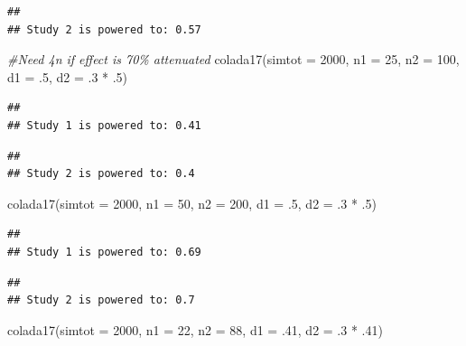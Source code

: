 \documentclass[
]{book}
\newenvironment{Shaded}{\begin{snugshade}}{\end{snugshade}}
\newcommand{\AttributeTok}[1]{\textcolor[rgb]{0.77,0.63,0.00}{#1}}
\newcommand{\CommentTok}[1]{\textcolor[rgb]{0.56,0.35,0.01}{\textit{#1}}}
\newcommand{\DecValTok}[1]{\textcolor[rgb]{0.00,0.00,0.81}{#1}}
\newcommand{\FunctionTok}[1]{\textcolor[rgb]{0.00,0.00,0.00}{#1}}
\newcommand{\NormalTok}[1]{#1}
\newcommand{\SpecialCharTok}[1]{\textcolor[rgb]{0.00,0.00,0.00}{#1}}
\begin{document}
\begin{verbatim}
## 
## Study 2 is powered to: 0.57
\end{verbatim}

\begin{Shaded}
\begin{Highlighting}[]
\CommentTok{\#Need 4n if effect is 70\% attenuated}
  \FunctionTok{colada17}\NormalTok{(}\AttributeTok{simtot =} \DecValTok{2000}\NormalTok{, }\AttributeTok{n1 =} \DecValTok{25}\NormalTok{, }\AttributeTok{n2 =} \DecValTok{100}\NormalTok{, }\AttributeTok{d1 =}\NormalTok{ .}\DecValTok{5}\NormalTok{, }\AttributeTok{d2 =}\NormalTok{ .}\DecValTok{3} \SpecialCharTok{*}\NormalTok{ .}\DecValTok{5}\NormalTok{)}
\end{Highlighting}
\end{Shaded}

\begin{verbatim}
## 
## Study 1 is powered to: 0.41
\end{verbatim}

\begin{verbatim}
## 
## Study 2 is powered to: 0.4
\end{verbatim}

\begin{Shaded}
\begin{Highlighting}[]
  \FunctionTok{colada17}\NormalTok{(}\AttributeTok{simtot =} \DecValTok{2000}\NormalTok{, }\AttributeTok{n1 =} \DecValTok{50}\NormalTok{, }\AttributeTok{n2 =} \DecValTok{200}\NormalTok{, }\AttributeTok{d1 =}\NormalTok{ .}\DecValTok{5}\NormalTok{, }\AttributeTok{d2 =}\NormalTok{ .}\DecValTok{3} \SpecialCharTok{*}\NormalTok{ .}\DecValTok{5}\NormalTok{)}
\end{Highlighting}
\end{Shaded}

\begin{verbatim}
## 
## Study 1 is powered to: 0.69
\end{verbatim}

\begin{verbatim}
## 
## Study 2 is powered to: 0.7
\end{verbatim}

\begin{Shaded}
\begin{Highlighting}[]
  \FunctionTok{colada17}\NormalTok{(}\AttributeTok{simtot =} \DecValTok{2000}\NormalTok{, }\AttributeTok{n1 =} \DecValTok{22}\NormalTok{, }\AttributeTok{n2 =} \DecValTok{88}\NormalTok{, }\AttributeTok{d1 =}\NormalTok{ .}\DecValTok{41}\NormalTok{, }\AttributeTok{d2 =}\NormalTok{ .}\DecValTok{3} \SpecialCharTok{*}\NormalTok{ .}\DecValTok{41}\NormalTok{)}
\end{Highlighting}
\end{Shaded}
\end{document}

